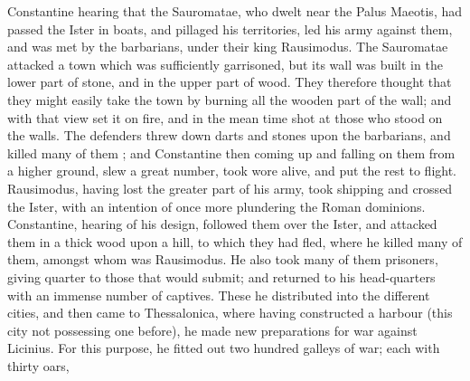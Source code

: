 Constantine hearing that the Sauromatae, who dwelt near the Palus Maeotis, had passed the Ister in boats, and pillaged his territories, led his army against them, and was met by the barbarians, under their king Rausimodus. The Sauromatae attacked a town which was sufficiently garrisoned, but its wall was built in the lower part of stone, and in the upper part of wood. They therefore thought that they might easily take the town by burning all the wooden part of the wall; and with that view set it on fire, and in the mean time shot at those who stood on the walls. The defenders threw down darts and stones upon the barbarians, and killed many of them ; and Constantine then coming up and falling on them from a higher ground, slew a great number, took wore alive, and put the rest to flight. Rausimodus, having lost the greater part of his army, took shipping and crossed the Ister, with an intention of once more plundering the Roman dominions. Constantine, hearing of his design, followed them over the Ister, and attacked them in a thick wood upon a hill, to which they had fled, where he killed many of them, amongst whom was Rausimodus. He also took many of them prisoners, giving quarter to those that would submit; and returned to his head-quarters with an immense number of captives. These he distributed into the different cities, and then came to Thessalonica, where having constructed a harbour (this city not possessing one before), he made new preparations for war against Licinius. For this purpose, he fitted out two hundred galleys of war; each with thirty oars,

